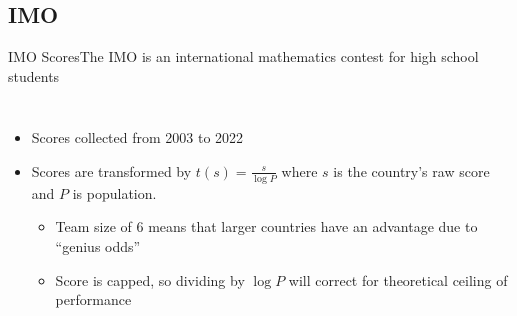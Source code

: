 \documentclass[10pt]{beamer}
\begin{document}
\subsection{IMO}
\begin{frame}{IMO Scores}{The IMO is an international mathematics contest for high school students
    }
    \begin{columns}
            \centering
            \begin{table}
            \caption{Top 10 countries by IMO score.}
        \end{table}
            \begin{itemize}
                \item Scores collected from 2003 to 2022
                \item Scores are transformed by $t(s) = \frac{s}{\log P}$ where $s$ is the country's raw score and $P$ is population.
                \begin{itemize}
                    \item Team size of 6 means that larger countries have an advantage due to ``genius odds''
                    \item Score is capped, so dividing by $\log P$ will correct for theoretical ceiling of performance
                \end{itemize}
            \end{itemize}
        \end{columns}
\end{frame}
\end{document}
